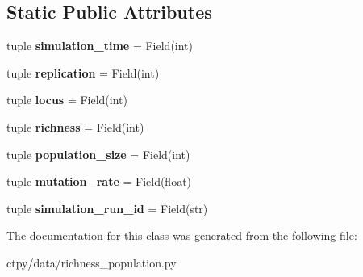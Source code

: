 \subsection*{Static Public Attributes}
\begin{DoxyCompactItemize}
\item 
\hypertarget{classctpy_1_1data_1_1richness__population_1_1_richness_sample_a2ab22098b5717c5e6b56111a257c6d65}{tuple {\bfseries simulation\-\_\-time} = Field(int)}\label{classctpy_1_1data_1_1richness__population_1_1_richness_sample_a2ab22098b5717c5e6b56111a257c6d65}

\item 
\hypertarget{classctpy_1_1data_1_1richness__population_1_1_richness_sample_aa52e6656d0ee603c7fa8839a73bdbc81}{tuple {\bfseries replication} = Field(int)}\label{classctpy_1_1data_1_1richness__population_1_1_richness_sample_aa52e6656d0ee603c7fa8839a73bdbc81}

\item 
\hypertarget{classctpy_1_1data_1_1richness__population_1_1_richness_sample_a11d69ad62eb0cfea1398ab07f382c3dd}{tuple {\bfseries locus} = Field(int)}\label{classctpy_1_1data_1_1richness__population_1_1_richness_sample_a11d69ad62eb0cfea1398ab07f382c3dd}

\item 
\hypertarget{classctpy_1_1data_1_1richness__population_1_1_richness_sample_aa8f49f1cb4f8e79f8e869708ccc131f0}{tuple {\bfseries richness} = Field(int)}\label{classctpy_1_1data_1_1richness__population_1_1_richness_sample_aa8f49f1cb4f8e79f8e869708ccc131f0}

\item 
\hypertarget{classctpy_1_1data_1_1richness__population_1_1_richness_sample_a7a32f3ee38da08e1291b114c219dc658}{tuple {\bfseries population\-\_\-size} = Field(int)}\label{classctpy_1_1data_1_1richness__population_1_1_richness_sample_a7a32f3ee38da08e1291b114c219dc658}

\item 
\hypertarget{classctpy_1_1data_1_1richness__population_1_1_richness_sample_aa98cb410fba2165a8e9cf07a7adeedd0}{tuple {\bfseries mutation\-\_\-rate} = Field(float)}\label{classctpy_1_1data_1_1richness__population_1_1_richness_sample_aa98cb410fba2165a8e9cf07a7adeedd0}

\item 
\hypertarget{classctpy_1_1data_1_1richness__population_1_1_richness_sample_ace79f1b9c235fb93832961547fd5c851}{tuple {\bfseries simulation\-\_\-run\-\_\-id} = Field(str)}\label{classctpy_1_1data_1_1richness__population_1_1_richness_sample_ace79f1b9c235fb93832961547fd5c851}

\end{DoxyCompactItemize}


The documentation for this class was generated from the following file\-:\begin{DoxyCompactItemize}
\item 
ctpy/data/richness\-\_\-population.\-py\end{DoxyCompactItemize}
